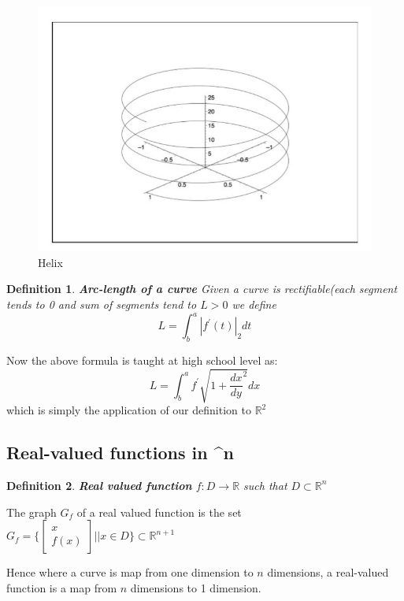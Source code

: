 \documentclass[titlepage]{article}
\newtheorem{definition}{Definition}
\newcommand{\Rn}{\mathbb{R}^n}
\begin{document}
\begin{figure}[H]
    \centering
    \includegraphics{src/helix.JPG}
    \caption{Helix}
    \label{fig:my_label}
\end{figure}


\begin{definition}\textbf{Arc-length of a curve}
Given a curve is rectifiable(each segment tends to 0 and sum of segments tend to $L>0$ we define
$$ L = \int_{b}^{a}|f^{\prime}(t)|_{2}dt$$
\end{definition}

Now the above formula is taught at high school level as:
$$ L = \int_{b}^{a}f^{\prime}\sqrt{1 + \frac{dx}{dy}^{2}} dx$$ which is simply the application of our definition to $^{2}$

\subsection{Real-valued functions in \Rn}

\begin{definition}\textbf{Real valued function}
$f: D \to \mathbb{R}$ such that $D \subset \Rn$
\end{definition}

The graph $G_{f}$ of a real valued function is the set $G_{f} = \{ \begin{bmatrix} x\\
f(x)
\end{bmatrix} | | x \in D\} \subset \mathbb{R}^{n+1}$

Hence where a curve is map from one dimension to $n$ dimensions, a real-valued function is a map from $n$ dimensions to 1 dimension. 
\end{document}

